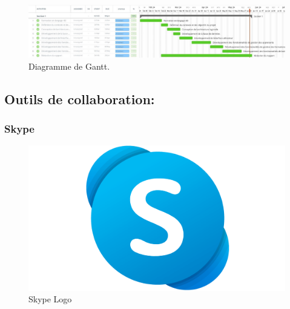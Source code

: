 
\begin{figure}
    \centering
    \includegraphics[width=\textheight,height=\textwidth,keepaspectratio]{Figures/DiagrammeDeGantt.jpg}
    \caption{Diagramme de Gantt.}
\end{figure}

\newpage
\subsection{Outils de collaboration:}

\subsubsection{Skype}

\begin{figure}[h]
    \centering
    \includegraphics[scale=0.02]{Logos/Skype-Logo.png} %
    \caption{Skype Logo}
\end{figure}

